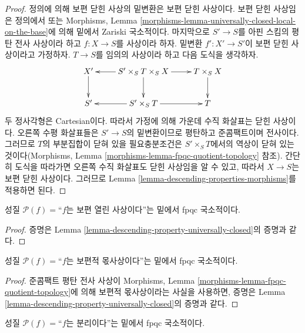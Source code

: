 \begin{proof}
정의에 의해 보편 닫힌 사상의 밑변환은 보편 닫힌 사상이다. 보편 닫힌
사상임은 정의에서 또는 Morphisms, Lemma
\ref{morphisms-lemma-universally-closed-local-on-the-base}에 의해 밑에서
Zariski 국소적이다. 마지막으로 $S' \to S$를 아핀 스킴의 평탄 전사
사상이라 하고 $f : X \to S$를 사상이라 하자. 밑변환
$f' : X' \to S'$이 보편 닫힌 사상이라고 가정하자. $T \to S$를 임의의
사상이라 하고 다음 도식을 생각하자.
$$
\xymatrix{
X' \ar[d] &
S' \times_S T \times_S X \ar[d] \ar[r] \ar[l] &
T \times_S X \ar[d] \\
S' &
S' \times_S T \ar[r] \ar[l] &
T
}
$$
두 정사각형은 Cartesian이다. 따라서 가정에 의해 가운데 수직 화살표는
닫힌 사상이다. 오른쪽 수평 화살표들은 $S' \to S$의 밑변환이므로
평탄하고 준콤팩트이며 전사이다. 그러므로 $T$의 부분집합이 닫혀 있을
필요충분조건은 $S' \times_S T$에서의 역상이 닫혀 있는 것이다(Morphisms,
Lemma \ref{morphisms-lemma-fpqc-quotient-topology} 참조). 간단히 도식을
따라가면 오른쪽 수직 화살표도 닫힌 사상임을 알 수 있고, 따라서
$X \to S$는 보편 닫힌 사상이다. 그러므로 Lemma
\ref{lemma-descending-properties-morphisms}를 적용하면 된다.
\end{proof}

\begin{lemma}
\label{lemma-descending-property-universally-open}
성질 $\mathcal{P}(f) =$“$f$는 보편 열린 사상이다”는 밑에서 fpqc
국소적이다.
\end{lemma}

\begin{proof}
증명은 Lemma \ref{lemma-descending-property-universally-closed}의
증명과 같다.
\end{proof}

\begin{lemma}
\label{lemma-descending-property-universally-submersive}
성질 $\mathcal{P}(f) =$“$f$는 보편적 몫사상이다”는 밑에서 fpqc
국소적이다.
\end{lemma}

\begin{proof}
준콤팩트 평탄 전사 사상이 Morphisms, Lemma
\ref{morphisms-lemma-fpqc-quotient-topology}에 의해 보편적 몫사상이라는
사실을 사용하면, 증명은 Lemma
\ref{lemma-descending-property-universally-closed}의 증명과 같다.
\end{proof}

\begin{lemma}
\label{lemma-descending-property-separated}
성질 $\mathcal{P}(f) =$“$f$는 분리이다”는 밑에서 fpqc 국소적이다.
\end{lemma}

